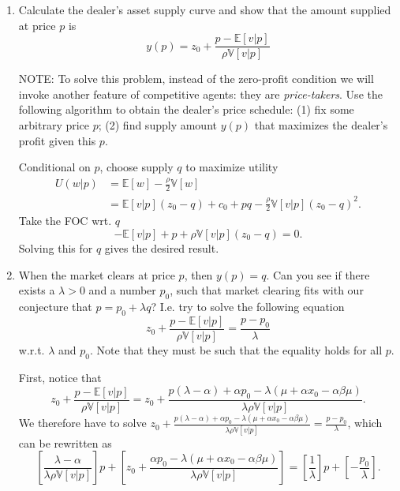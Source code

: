 \documentclass[11pt
, answers
]{exam}
\begin{document}
\begin{enumerate}[label=(\alph*). ]
\item Calculate the dealer's asset supply curve and show that the amount supplied at price $p$ is
\[
y(p) =z_{0} +  \frac{p - \mathbb{E}[v|p]}{\rho \mathbb{V}[v|p]} 
\]

NOTE: To solve this problem, instead of the zero-profit condition we will invoke another feature of competitive agents: they are \emph{price-takers}. Use the following algorithm to obtain the dealer's price schedule: (1) fix some arbitrary price $p$; (2) find supply amount $y(p)$ that maximizes the dealer's profit given this $p$. 

\begin{solution}
Conditional on $p$, choose supply $q$ to maximize utility
\begin{align*}
U(w|p) 
& = \mathbb{E}[w] - \frac{\rho}{2} \mathbb{V}[w] \\
& = \mathbb{E}[v|p](z_{0}-q) + c_{0}+pq - \frac{\rho}{2} \mathbb{V}[v|p](z_{0}-q)^{2}.
\end{align*}
Take the FOC wrt. $q$
\[
-\mathbb{E}[v|p] + p +\rho\mathbb{V}[v|p](z_{0}-q) = 0.
\]
Solving this for $q$ gives the desired result.
\end{solution}


\item When the market clears at price $p$, then $y(p)=q$. Can you see if there exists a $\lambda>0$ and a number $p_{0}$, such that market clearing fits with our conjecture that $p=p_{0}+\lambda q$? I.e. try to solve the following equation
\[
z_{0} +  \frac{p - \mathbb{E}[v|p]}{\rho \mathbb{V}[v|p]} = \frac{p-p_{0}}{\lambda}
\]
w.r.t. $\lambda$ and $p_0$. Note that they must be such that the equality holds for all $p$.

\begin{solution}
First, notice that
\[
z_{0}+ \frac{p-\mathbb{E}[v|p]}{\rho \mathbb{V}[v|p]}=z_{0}+\frac{p(\lambda-\alpha) +\alpha p_{0}-\lambda (\mu + \alpha x_{0} - \alpha \beta \mu) }{\lambda \rho \mathbb{V}[v|p]}.
\]
We therefore have to solve $z_{0}+\frac{p(\lambda-\alpha) +\alpha p_{0}-\lambda (\mu + \alpha x_{0} - \alpha \beta \mu) }{\lambda \rho \mathbb{V}[v|p]}= \frac{p-p_{0}}{\lambda}$, which can be rewritten as
\[
\left[ \frac{\lambda-\alpha }{\lambda \rho \mathbb{V}[v|p]}  \right]p + \left[ z_{0} +\frac{\alpha p_{0}-\lambda (\mu + \alpha x_{0} - \alpha \beta \mu) }{\lambda \rho \mathbb{V}[v|p]} \right] = \left[\frac{1}{\lambda}\right]p + \left[-\frac{p_{0}}{\lambda}\right].
\]


\end{solution}
\end{enumerate}
\end{document}
